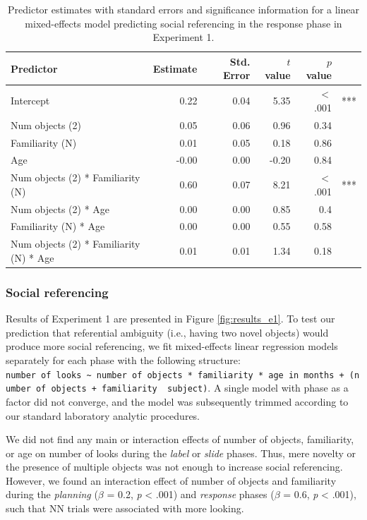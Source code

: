 \documentclass[a4paper,man,apacite,floatsintext]{apa6}
\begin{document}
\begin{table}[b]
\centering
\begin{tabular}{lrrrrl}
 Predictor & Estimate & Std. Error & $t$ value & $p$ value &  \\ 
  \hline
Intercept & 0.22 & 0.04 & 5.35 & $<$ .001 & *** \\ 
  Num objects (2) & 0.05 & 0.06 & 0.96 & 0.34 &  \\ 
  Familiarity (N) & 0.01 & 0.05 & 0.18 & 0.86 &  \\ 
  Age & -0.00 & 0.00 & -0.20 & 0.84 &  \\ 
  Num objects (2) * Familiarity (N) & 0.60 & 0.07 & 8.21 & $<$ .001 & *** \\ 
  Num objects (2) * Age & 0.00 & 0.00 & 0.85 & 0.4 &  \\ 
  Familiarity (N) * Age & 0.00 & 0.00 & 0.55 & 0.58 &  \\ 
  Num objects (2) * Familiarity (N) * Age & 0.01 & 0.01 & 1.34 & 0.18 &  \\ 
   \hline
\end{tabular}
\caption{Predictor estimates with standard errors and significance information for a linear mixed-effects model predicting social referencing in the response phase in Experiment 1.} 
\label{tab:exp1_r_reg}
\end{table}

\subsubsection{Social referencing}\label{social-referencing}

Results of Experiment 1 are presented in Figure \ref{fig:results_e1}. To
test our prediction that referential ambiguity (i.e., having two novel
objects) would produce more social referencing, we fit mixed-effects
linear regression models separately for each phase with the following
structure:
\texttt{number\ of\ looks\ \textasciitilde{}\ number\ of\ objects\ *\ familiarity\ *\ age\ in\ months\ +\ (number\ of\ objects\ +\ familiarity\ \textbar{}\ subject)}.
A single model with phase as a factor did not converge, and the model
was subsequently trimmed according to our standard laboratory analytic
procedures.

We did not find any main or interaction effects of number of objects,
familiarity, or age on number of looks during the \emph{label} or
\emph{slide} phases. Thus, mere novelty or the presence of multiple
objects was not enough to increase social referencing. However, we found
an interaction effect of number of objects and familiarity during the
\emph{planning} (\(\beta\) = 0.2, \emph{p} \textless{} .001) and
\emph{response} phases (\(\beta\) = 0.6, \emph{p} \textless{} .001),
such that NN trials were associated with more looking.
\end{document}
